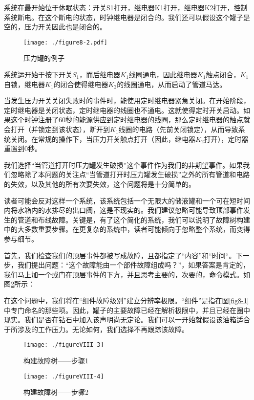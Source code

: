 \documentclass[cn,11pt,chinese]{elegantbook}
\begin{document}
{系统在最开始位于休眠状态：开关S1打开，继电器K1打开，继电器K2打开，控制系统断电。在这个断电的状态，时钟继电器是闭合的。我们还可以假设这个罐子是空的，压力开关因此也是闭合的。

\begin{figure}[h]
	\centering
	\texttt{[image: ./figure8-2.pdf]}
	\caption{压力罐的例子}
	\label{fig8-2}
\end{figure}

系统运开始于按下开关$S_1$，而后继电器$K_1$线圈通电，因此继电器$K_1$触点闭合，$K_1$自锁，继电器$K_1$的闭合使得继电器$K_2$的线圈通电，从而启动了管道马达。

当发生压力开关关闭失败时的事件时，能使用定时继电器紧急关闭。在开始阶段，定时继电器是关闭状态，定时继电器的线圈也不通电。这就使得定时开关启动。如果这个时钟注册了60秒的能源供应到定时继电器的线圈，那么定时继电器的触点就会打开（并锁定到该状态），断开到$K_1$线圈的电路（先前关闭锁定），从而导致系统关闭。在常规的操作下，当压力开关触点打开（因此，继电器$K_2$打开），定时器重置到0秒。

我们选择“当管道打开时压力罐发生破损”这个事件作为我们的非期望事件。如果我们忽略除了本问题的关注点“当管道打开时压力罐发生破损”之外的所有管道和电路的失效，以及其他的所有次要失效，这个问题将是十分简单的。

读者可能会反对这样一个系统，该系统包括一个无限大的储液罐和一个可在短时间内将水箱内的水排尽的出口阀，这是不现实的。我们建议忽略可能导致顶部事件发生的管道和布线故障。关键是，有了这个简化的系统，我们可以说明了故障树构建中的大多数重要步骤。在更复杂的系统中，读者可能倾向于忽略整个系统，而变得参与细节。

首先，我们检查我们的顶层事件都被写成故障，且都指定了“内容”和“时间“。下一步，我们提出问题：“这个故障能由一个部件故障组成吗？”，如果答案是肯定的，我们马上加一个或门在顶层事件的下方，并且思考主要的，次要的，命令模式。如图\ref{fig8-3}所示：

在这个问题中，我们将在“组件故障级别”建立分辨率极限。“组件”是指在图\ref{fig8-1}中专门命名的那些项。因此，罐子的主要故障已经在解析极限中，并且已经在圈中现实。我们是否在钻石中加入该声明尚无定论。我们可以一开始就假设该油箱适合于所涉及的工作压力。无论如何，我们选择不再跟踪该故障。

\begin{figure}[H]
	\centering
	\texttt{[image: ./figureVIII-3]}
	\caption{构建故障树——步骤1}
	\label{fig8-3}
\end{figure}

\begin{figure}[H]
	\centering
	\texttt{[image: ./figureVIII-4]}
	\caption{构建故障树——步骤2}
	\label{fig8-4}
\end{figure}

}
\end{document}
